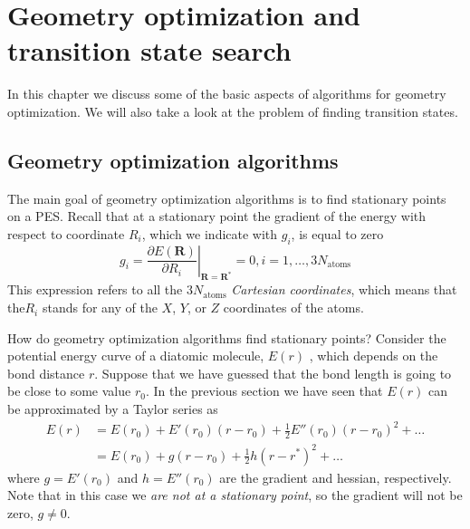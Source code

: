 \documentclass[../Main/chem371-notes.tex]{subfiles}
\begin{document}
\chapter{Geometry optimization and transition state search}

In this chapter we discuss some of the basic aspects of algorithms for geometry optimization.
We will also take a look at the problem of finding transition states.

\section{Geometry optimization algorithms}
The main goal of geometry optimization algorithms is to find stationary points on a PES.
Recall that at a stationary point the gradient of the energy with respect to coordinate $R_i$, which we indicate with $g_i$, is equal to zero
\begin{equation}
g_i = \left.\frac{\partial E(\mathbf{R})}{\partial R_i}\right|_{\mathbf{R}=\mathbf{R}^*} = 0, i=1,\ldots,3 N_\mathrm{atoms}
\end{equation}
This expression refers to all the $3 N_\mathrm{atoms}$ \emph{Cartesian coordinates}, which means that the$R_i$ stands for any of the $X$, $Y$, or $Z$ coordinates of the atoms.

How do geometry optimization algorithms find stationary points?
Consider the potential energy curve of a diatomic molecule, $E(r)$ , which depends on the bond distance $r$.
Suppose that we have guessed that the bond length is going to be close to some value $r_0$.
In the previous section we have seen that $E(r)$ can be approximated by a Taylor series as
\begin{equation}
\begin{split}
E(r) & = E(r_0) + E'(r_0) (r - r_0) + \frac{1}{2} E''(r_0) (r - r_0)^2 + \ldots \\
& = E(r_0) + g (r - r_0) + \frac{1}{2} h (r - r^*)^2 + \ldots
\end{split}
\end{equation}
where $g = E'(r_0)$ and $h = E''(r_0)$ are the gradient and hessian, respectively.
Note that in this case we \emph{are not at a stationary point}, so the gradient will not be zero, $g \neq 0$.
\end{document}
